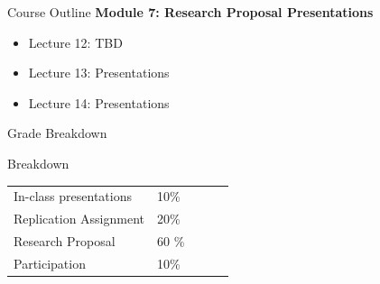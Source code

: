 \documentclass[
  ignorenonframetext,
  aspectratio=169]{beamer}
\providecommand{\tightlist}{%
  \setlength{\itemsep}{0pt}\setlength{\parskip}{0pt}}
\begin{document}
\begin{frame}{Course Outline}
\protect\hypertarget{course-outline-3}{}
\textbf{Module 7: Research Proposal Presentations}

\begin{itemize}
\tightlist
\item
  Lecture 12: TBD
\item
  Lecture 13: Presentations
\item
  Lecture 14: Presentations
\end{itemize}
\end{frame}

\begin{frame}{}
\protect\hypertarget{section-3}{}
\centering

\huge Grade Breakdown
\end{frame}

\begin{frame}{Breakdown}
\protect\hypertarget{breakdown}{}
\Large

\begin{table}[]
\begin{tabular}{lllll}
In-class presentations      & 10\% &  &  &  \\
Replication Assignment           & 20\% &  &  &  \\
Research Proposal & 60 \% &  &  &  \\
Participation                     & 10\%     &  &  & 
\end{tabular}
\end{table}
\end{frame}
\end{document}
